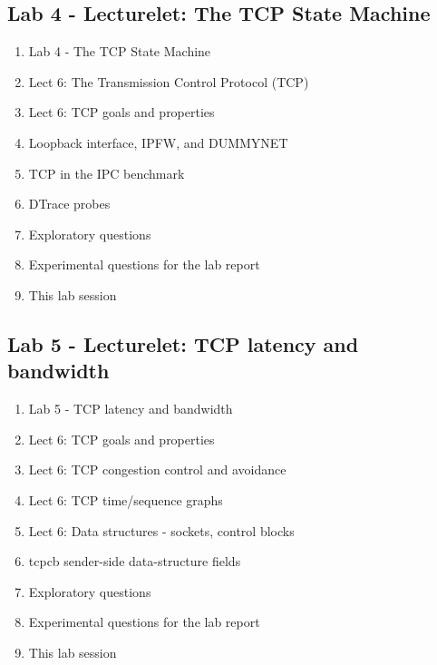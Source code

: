 \documentclass[a4paper,10pt]{article}
\begin{document}
\subsection*{Lab 4 - Lecturelet: The TCP State Machine}

\begin{enumerate}
  \item Lab 4 - The TCP State Machine
  \item Lect 6: The Transmission Control Protocol (TCP)
  \item Lect 6: TCP goals and properties
  \item Loopback interface, IPFW, and DUMMYNET
  \item TCP in the IPC benchmark
  \item DTrace probes
  \item Exploratory questions
  \item Experimental questions for the lab report
  \item This lab session
\end{enumerate}

\subsection*{Lab 5 - Lecturelet: TCP latency and bandwidth}

\begin{enumerate}
  \item Lab 5 - TCP latency and bandwidth
  \item Lect 6: TCP goals and properties
  \item Lect 6: TCP congestion control and avoidance
  \item Lect 6: TCP time/sequence graphs
  \item Lect 6: Data structures - sockets, control blocks
  \item tcpcb sender-side data-structure fields
  \item Exploratory questions
  \item Experimental questions for the lab report
  \item This lab session
\end{enumerate}
\end{document}
